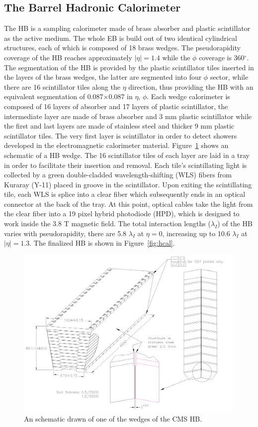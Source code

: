 \subsection{The Barrel Hadronic Calorimeter}
The HB is a sampling calorimeter made of brass absorber and plastic
scintillator as the active medium. The whole EB is build out of two
identical cylindrical structures, each of which is composed of 18
brass wedges. The pseudorapidity coverage of the HB reaches
approximately $|\eta| = 1.4$ while the $\phi$ coverage is
360$^{\circ}$. The segmentation of the HB is provided by the plastic
scintillator tiles inserted in the layers of the brass wedges, the latter
are segmented into four $\phi$ sector, while there are 16 scintillator
tiles along the $\eta$ direction, thus providing the HB with an
equivalent segmentation of 0.087$\times$0.087 in $\eta$, $\phi$. Each
wedge calorimeter is composed of 16 layers of absorber and 17 layers of
plastic scintillator, the intermediate layer are made of brass
absorber and 3 mm plastic scintillator while the first and last layers
are made of stainless steel  and thicker 9 mm plastic scintillator
tiles. The very first layer is scintillator in order to detect showers
developed in the electromagnetic calorimeter
material. Figure~\ref{fig:HCALwedge} shows an schematic of a HB
wedge. The 16 scintillator tiles of each layer are laid in a tray in
order to facilitate their insertion and removal. Each tile's
scintillating light is collected by a green double-cladded
wavelength-shifting (WLS) fibers from Kuraray (Y-11) placed in groove
in the scintillator. Upon exiting the scintillating tile, each WLS is
splice into a clear fiber which subsequently ends in an optical
connector at the back of the tray. At this point, optical cables
take the light from the clear fiber into a 19 pixel hybrid photodiode
(HPD), which is designed to work inside the 3.8 T magnetic field. The
total interaction lengths ($\lambda_{I}$) of the HB varies with
pseudorapidity, there are 5.8 $\lambda_{I}$ at $\eta = 0$, increasing
up to 10.6 $\lambda_{I}$ at $|\eta| = 1.3$.
The finalized HB is shown in Figure~\ref{fig:hcal}.
\begin{figure}
 \centering
\includegraphics[width=0.99\textwidth]{CMS_DetectorFigures/HCAL_Wedge.pdf}
\caption{An schematic drawn of one of the wedges of the CMS HB.\label{fig:HCALwedge}}
\end{figure}
